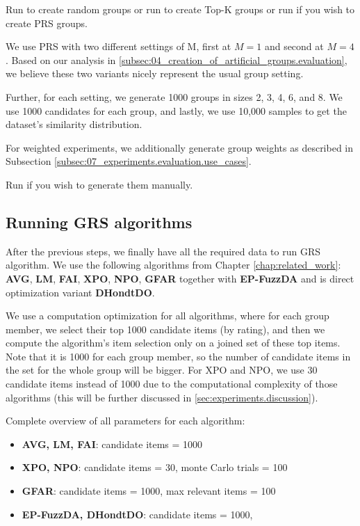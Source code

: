         Run  to create random groups \newline
        or run  to create Top-K groups \newline
        or run  if you wish to create PRS groups.
        
        We use PRS with two different settings of M, first at $M=1$ and second at $M=4$. Based on our analysis in \ref{subsec:04_creation_of_artificial_groups.evaluation}, we believe these two variants nicely represent the usual group setting.
        
        Further, for each setting, we generate 1000 groups in sizes 2, 3, 4, 6, and 8. We use 1000 candidates for each group, and lastly, we use 10,000 samples to get the dataset's similarity distribution.

        For weighted experiments, we additionally generate group weights as described in Subsection \ref{subsec:07_experiments.evaluation.use_cases}.
        
        Run  if you wish to generate them manually.
    
    \subsection{Running GRS algorithms}
        After the previous steps, we finally have all the required data to run GRS algorithm. We use the following algorithms from Chapter \ref{chap:related_work}: \textbf{AVG}, \textbf{LM}, \textbf{FAI}, \textbf{XPO\cite{sacharidis_2019_top_n_with_fairness}}, \textbf{NPO}, \textbf{GFAR\cite{GFAR-kaya2020}} together with \textbf{EP-FuzzDA} and is direct optimization variant \textbf{DHondtDO}.

        We use a computation optimization for all algorithms, where for each group member, we select their top 1000 candidate items (by rating), and then we compute the algorithm's item selection only on a joined set of these top items. Note that it is 1000 for each group member, so the number of candidate items in the set for the whole group will be bigger. For XPO and NPO, we use 30 candidate items instead of 1000 due to the computational complexity of those algorithms (this will be further discussed in \ref{sec:experiments.discussion}).

        Complete overview of all parameters for each algorithm:
        \begin{itemize}
            \item \textbf{AVG, LM, FAI}: candidate items = 1000
            \item \textbf{XPO, NPO}: candidate items = 30, monte Carlo trials = 100
            \item \textbf{GFAR}: candidate items = 1000, max relevant items = 100
            \item \textbf{EP-FuzzDA, DHondtDO}: candidate items = 1000, 
        \end{itemize}

